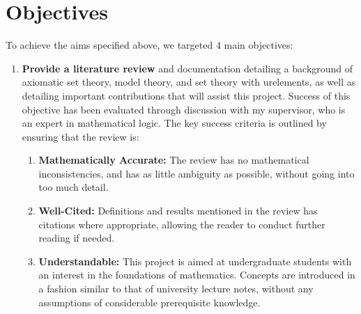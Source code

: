 \documentclass[11pt]{report}
\theoremstyle{definition}
\theoremstyle{theorem}
\theoremstyle{lemma}
\begin{document}
\section{Objectives}
To achieve the aims specified above, we targeted 4 main objectives:
\begin{enumerate}
  \item \textbf{Provide a literature review} and documentation detailing a background of axiomatic set theory, model theory, and set theory with urelements, as well as detailing important contributions that will assist this project.
  Success of this objective has been evaluated through discussion with my supervisor, who is an expert in mathematical logic. 
  The key success criteria is outlined by ensuring that the review is:
  \begin{enumerate}
    \item \textbf{Mathematically Accurate:} The review has no mathematical inconsistencies, and has as little ambiguity as possible, without going into too much detail. 
    \item \textbf{Well-Cited:} Definitions and results mentioned in the review has citations where appropriate, allowing the reader to conduct further reading if needed. 
    \item \textbf{Understandable:} This project is aimed at undergraduate students with an interest in the foundations of mathematics. Concepts are introduced in a fashion similar to that of university lecture notes, without any assumptions of considerable prerequisite knowledge. 
  \end{enumerate} 


\end{enumerate}
\end{document}
